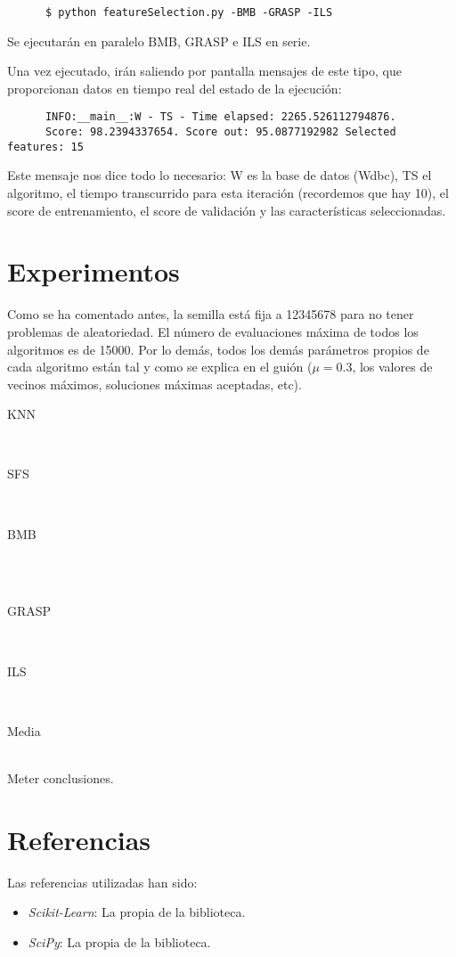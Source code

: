 \documentclass[a4paper, 11pt]{article}
\begin{document}
    \begin{verbatim}
      $ python featureSelection.py -BMB -GRASP -ILS
    \end{verbatim}
    Se ejecutarán en paralelo BMB, GRASP e ILS en serie.

    Una vez ejecutado, irán saliendo por pantalla mensajes de este tipo, que proporcionan datos en tiempo real del estado de la ejecución:

    \begin{verbatim}
      INFO:__main__:W - TS - Time elapsed: 2265.526112794876.
      Score: 98.2394337654. Score out: 95.0877192982 Selected features: 15
    \end{verbatim}

    Este mensaje nos dice todo lo necesario: W es la base de datos (Wdbc), TS el algoritmo, el tiempo transcurrido para esta iteración (recordemos que hay 10), el score de entrenamiento, el score de validación y las características seleccionadas.
  \section{Experimentos}
    Como se ha comentado antes, la semilla está fija a 12345678 para no tener problemas de aleatoriedad. El número de evaluaciones máxima de todos los algoritmos es de 15000. Por lo demás, todos los demás parámetros propios de cada algoritmo están tal y como se explica en el guión ($\mu=0.3$, los valores de vecinos máximos, soluciones máximas aceptadas, etc). \\

    \newpage

    \centerline{KNN}
    \\
    \centerline{SFS}
    
    \\ \centerline{BMB}
    \\
    \\ \centerline{GRASP}
    
    \\ \centerline{ILS}
     \\
    \newpage
    \centerline{Media}
    \\

    Meter conclusiones.



  \section{Referencias}

  Las referencias utilizadas han sido:
  \begin{itemize}
    \item \emph{Scikit-Learn}: La propia  de la biblioteca.
    \item \emph{SciPy}: La propia  de la biblioteca.
  \end{itemize}
\end{document}
